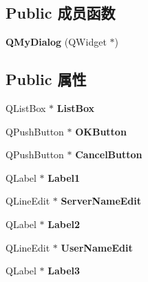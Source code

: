 \subsection*{Public 成员函数}
\begin{DoxyCompactItemize}
\item 
\mbox{\label{class_q_my_dialog_a19132fb717f23670228400fadaa47852}} 
{\bfseries Q\+My\+Dialog} (Q\+Widget $\ast$)
\end{DoxyCompactItemize}
\subsection*{Public 属性}
\begin{DoxyCompactItemize}
\item 
\mbox{\label{class_q_my_dialog_a1afe1fc0cdbdd59aa04ab87bd9f538b4}} 
Q\+List\+Box $\ast$ {\bfseries List\+Box}
\item 
\mbox{\label{class_q_my_dialog_a4638035c77f28b12fee0b411d14bfa5a}} 
Q\+Push\+Button $\ast$ {\bfseries O\+K\+Button}
\item 
\mbox{\label{class_q_my_dialog_a14ea7f0dbbacc9f81e62377de347664b}} 
Q\+Push\+Button $\ast$ {\bfseries Cancel\+Button}
\item 
\mbox{\label{class_q_my_dialog_a949cd06bbba25131ec3012fe353750dd}} 
Q\+Label $\ast$ {\bfseries Label1}
\item 
\mbox{\label{class_q_my_dialog_abc31cd6e2467cc55bfbbabca416bdaa2}} 
Q\+Line\+Edit $\ast$ {\bfseries Server\+Name\+Edit}
\item 
\mbox{\label{class_q_my_dialog_aac4b0c42c52eabb72134e436d822e517}} 
Q\+Label $\ast$ {\bfseries Label2}
\item 
\mbox{\label{class_q_my_dialog_af4cf961ee3af2c839a25fa603679e4ea}} 
Q\+Line\+Edit $\ast$ {\bfseries User\+Name\+Edit}
\item 
\mbox{\label{class_q_my_dialog_a7045ac9022517eae552363b6bc06d60b}} 
Q\+Label $\ast$ {\bfseries Label3}
\item 

\end{DoxyCompactItemize}
